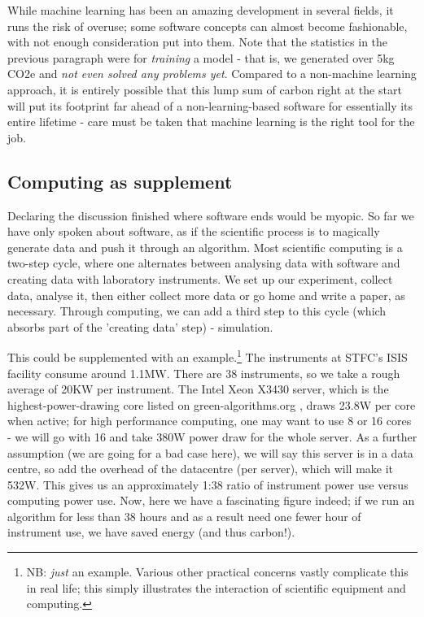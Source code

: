 \documentclass{article}
\begin{document}
While machine learning has been an amazing development in several fields, it runs the risk of overuse; some software concepts can almost become fashionable, with not enough consideration put into them. Note that the statistics in the previous paragraph were for \emph{training} a model - that is, we generated over 5kg CO2e and \emph{not even solved any problems yet}. Compared to a non-machine learning approach, it is entirely possible that this lump sum of carbon right at the start will put its footprint far ahead of a non-learning-based software for essentially its entire lifetime - care must be taken that machine learning is the right tool for the job.


\subsection{Computing as supplement}
Declaring the discussion finished where software ends would be myopic. So far we have only spoken about software, as if the scientific process is to magically generate data and push it through an algorithm. Most scientific computing is a two-step cycle, where one alternates between analysing data with software and creating data with laboratory instruments. We set up our experiment, collect data, analyse it, then either collect more data or go home and write a paper, as necessary. Through computing, we can add a third step to this cycle (which absorbs part of the 'creating data' step) - simulation. \newline

This could be supplemented with an example.\footnote{NB: \emph{just} an example. Various other practical concerns vastly complicate this in real life; this simply illustrates the interaction of scientific equipment and computing.} The instruments at STFC's ISIS facility consume around 1.1MW.\citep{findlay2021practical} There are 38 instruments, so we take a rough average of 20KW per instrument. The Intel Xeon X3430 server, which is the highest-power-drawing core listed on green-algorithms.org \citep{lannelongue2021green}, draws 23.8W per core when active; for high performance computing, one may want to use 8 or 16 cores - we will go with 16 and take 380W power draw for the whole server. As a further assumption (we are going for a bad case here), we will say this server is in a data centre, so add the overhead of the datacentre (per server), which will make it 532W. This gives us an approximately 1:38 ratio of instrument power use versus computing power use. Now, here we have a fascinating figure indeed; if we run an algorithm for less than 38 hours and as a result need one fewer hour of instrument use, we have saved energy (and thus carbon!). \newline
\end{document}
